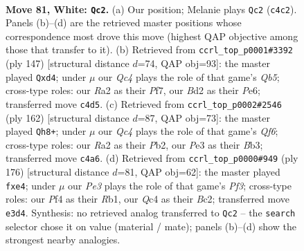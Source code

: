 \documentclass[11pt]{article}
\begin{document}
\clearpage

\begin{figure}[p]\centering
\begin{subfigure}{0.46\textwidth}\centering
\resizebox{\linewidth}{!}{%
\newchessgame
\chessboard[
  setfen={4q3/6k1/8/P1p2p2/2QpnPpb/4P3/R2B4/1r1N1K2 w - - 5 81},
  showmover=false,
  pgfstyle=straightmove, color=movearrow, markmove={c4-c2}
]}
\caption{}
\end{subfigure}\hfill
\begin{subfigure}{0.46\textwidth}\centering
\resizebox{\linewidth}{!}{%
\newchessgame
\chessboard[
  setfen={7k/5p2/2p1p2P/2P2rP1/1q1PNb2/5P1K/1p2Q3/1R6 b - - 2 74},
  showmover=false,
  pgfstyle=straightmove, color=movearrow, markmove={b4-d4}
]}
\caption{}
\end{subfigure}
\\[4pt]
\begin{subfigure}{0.46\textwidth}\centering
\resizebox{\linewidth}{!}{%
\newchessgame
\chessboard[
  setfen={5k2/5p2/3n1Qp1/2q3P1/P6p/1B5P/KP6/8 w - - 5 82},
  showmover=false,
  pgfstyle=straightmove, color=movearrow, markmove={f6-h8}
]}
\caption{}
\end{subfigure}\hfill
\begin{subfigure}{0.46\textwidth}\centering
\resizebox{\linewidth}{!}{%
\newchessgame
\chessboard[
  setfen={8/1p2n2k/5b1p/p1P2p2/3qpp2/5P1Q/2B4P/1R5K w - - 0 89},
  showmover=false,
  pgfstyle=straightmove, color=movearrow, markmove={f3-e4}
]}
\caption{}
\end{subfigure}
\caption{\textbf{Move 81, White: \texttt{Qc2}.} (a) Our position; Melanie plays \texttt{Qc2} (\texttt{c4c2}). Panels (b)--(d) are the retrieved master positions whose correspondence most drove this move (highest QAP objective among those that transfer to it). (b) Retrieved from \texttt{ccrl\_top\_p0001\#3392} (ply 147) [structural distance $d$=74, QAP obj=93]: the master played \texttt{Qxd4}; under $\mu$ our \emph{Qc4} plays the role of that game's \emph{Qb5}; cross-type roles: our \emph{R}a2 as their \emph{P}f7, our \emph{B}d2 as their \emph{P}e6; transferred move \texttt{c4d5}. (c) Retrieved from \texttt{ccrl\_top\_p0002\#2546} (ply 162) [structural distance $d$=87, QAP obj=73]: the master played \texttt{Qh8+}; under $\mu$ our \emph{Qc4} plays the role of that game's \emph{Qf6}; cross-type roles: our \emph{R}a2 as their \emph{P}b2, our \emph{P}e3 as their \emph{B}b3; transferred move \texttt{c4a6}. (d) Retrieved from \texttt{ccrl\_top\_p0000\#949} (ply 176) [structural distance $d$=81, QAP obj=62]: the master played \texttt{fxe4}; under $\mu$ our \emph{Pe3} plays the role of that game's \emph{Pf3}; cross-type roles: our \emph{P}f4 as their \emph{R}b1, our \emph{Q}c4 as their \emph{B}c2; transferred move \texttt{e3d4}. Synthesis: no retrieved analog transferred to \texttt{Qc2} -- the \texttt{search} selector chose it on value (material / mate); panels (b)--(d) show the strongest nearby analogies.}
\label{fig:thought-m160}
\end{figure}
\end{document}
